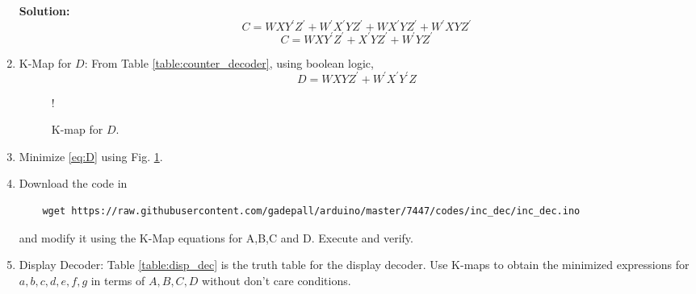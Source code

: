 \documentclass[journal,12pt,twocolumn]{IEEEtran}
\begin{document}
\begin{enumerate}
\textbf{Solution:}
\begin{equation}
	C = WXY^{\prime}Z^{\prime} + W^{\prime}X^{\prime}YZ^{\prime}
	+WX^{\prime}YZ^{\prime}
	+W^{\prime}XYZ^{\prime}
\end{equation}
\begin{equation}
	C = WXY^{\prime}Z^{\prime}  +  X^{\prime}YZ^{\prime} + W^{\prime}YZ^{\prime}
\end{equation}
%
\item {K-Map for $D$: }
From Table \ref{table:counter_decoder}, using boolean logic,
\begin{equation}
	\label{eq:D}
	D = WXYZ^{\prime} + W^{\prime}X^{\prime}Y^{\prime}Z
\end{equation}
%
\begin{figure}[!h]
	\resizebox {\columnwidth} {!} {
		
	}
	\caption{K-map for $D$.}
	\label{fig:kmap_D}
\end{figure}
%
\item 
Minimize \eqref{eq:D} using Fig. \ref{fig:kmap_D}.
%
\item Download the code in
\begin{lstlisting}
	wget https://raw.githubusercontent.com/gadepall/arduino/master/7447/codes/inc_dec/inc_dec.ino
\end{lstlisting}
%
and modify it using the K-Map equations for A,B,C and D. Execute and verify.
\item {Display Decoder:}
Table \ref{table:disp_dec} is the truth table for the display decoder.  
Use K-maps to obtain the minimized expressions for $a,b,c,d,e,f,g$ in terms of $A,B,C,D$ without don't care conditions.
%


\end{enumerate}
\end{document}
